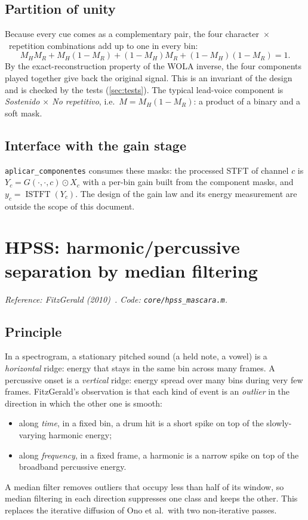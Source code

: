 \documentclass[11pt,a4paper]{article}
\newcommand{\code}[1]{\texttt{#1}}
\DeclareMathOperator{\ISTFT}{ISTFT}
\begin{document}
\subsection{Partition of unity}
Because every cue comes as a complementary pair, the four
character~$\times$~repetition combinations add up to one in every bin:
\begin{equation}
  M_HM_R + M_H(1-M_R) + (1-M_H)M_R + (1-M_H)(1-M_R) = 1 .
  \label{eq:unity}
\end{equation}
By the exact-reconstruction property of the WOLA inverse, the four
components played together give back the original signal. This is an
invariant of the design and is checked by the tests (\cref{sec:tests}).
The typical lead-voice component is \emph{Sostenido $\times$ No repetitivo},
i.e.\ $M = M_H(1-M_R)$: a product of a binary and a soft mask.

\subsection{Interface with the gain stage}
\code{aplicar\_componentes} consumes these masks: the processed STFT of
channel $c$ is $Y_c = G(\cdot,\cdot,c)\odot X_c$ with a per-bin gain built
from the component masks, and $y_c=\ISTFT(Y_c)$. The design of the gain
law and its energy measurement are outside the scope of this document.

\section{HPSS: harmonic/percussive separation by median filtering}
\label{sec:hpss}
\noindent\textit{Reference: FitzGerald (2010)~\cite{fitzgerald2010}.
Code: \code{core/hpss\_mascara.m}.}

\subsection{Principle}
In a spectrogram, a stationary pitched sound (a held note, a vowel) is a
\emph{horizontal} ridge: energy that stays in the same bin across many
frames. A percussive onset is a \emph{vertical} ridge: energy spread over
many bins during very few frames. FitzGerald's observation is that each
kind of event is an \emph{outlier} in the direction in which the other one
is smooth:
\begin{itemize}[nosep]
  \item along \emph{time}, in a fixed bin, a drum hit is a short spike on
        top of the slowly-varying harmonic energy;
  \item along \emph{frequency}, in a fixed frame, a harmonic is a narrow
        spike on top of the broadband percussive energy.
\end{itemize}
A median filter removes outliers that occupy less than half of its window,
so median filtering in each direction suppresses one class and keeps the
other. This replaces the iterative diffusion of Ono et al.\ with two
non-iterative passes.
\end{document}
